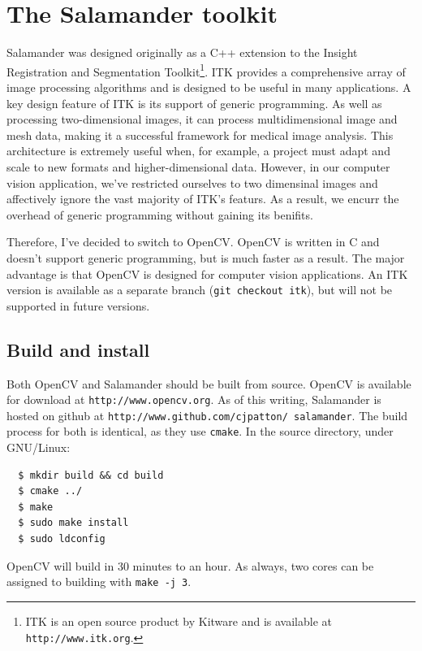 \documentclass[letter]{article}
\newcounter{foot}
\begin{document}
\section{The Salamander toolkit}
Salamander was designed originally as a C++ extension to the Insight Registration and 
Segmentation Toolkit\footnote
{ITK is an open source product by Kitware and is available at \texttt{http://www.itk.org}.}.
ITK provides a comprehensive array of image processing algorithms and is designed to 
be useful in many applications. A key design feature of ITK is its support of generic programming. 
As well as processing two-dimensional images, it can process multidimensional image and 
mesh data, making it a successful framework for medical image analysis. This architecture 
is extremely useful when, for example, a project must adapt and scale to new formats and 
higher-dimensional data. However, in our computer vision application, we've restricted 
ourselves to two dimensinal images and affectively ignore the vast majority of ITK's featurs. 
As a result, we encurr the overhead of generic programming without gaining its benifits. 

Therefore, I've decided to switch to OpenCV. OpenCV is written in C and doesn't support 
generic programming, but is much faster as a result. The major advantage is that OpenCV
is designed for computer vision applications. An ITK version is available as a separate 
branch (\texttt{git checkout itk}), but will not be supported in future versions. 

\subsection{Build and install}
Both OpenCV and Salamander should be built from source. OpenCV is available for download at 
\texttt{http://www.opencv.org}. As of this writing, Salamander 
is hosted on github at \texttt{http://www.github.com/cjpatton/ salamander}. The build 
process for both is identical, as they use \texttt{cmake}. In the source directory, 
under GNU/Linux: 
\begin{verbatim}
  $ mkdir build && cd build
  $ cmake ../ 
  $ make
  $ sudo make install 
  $ sudo ldconfig
\end{verbatim}
OpenCV will build in 30 minutes to an hour. As always, 
two cores can be assigned to building with \texttt{make -j 3}. 
\end{document}
